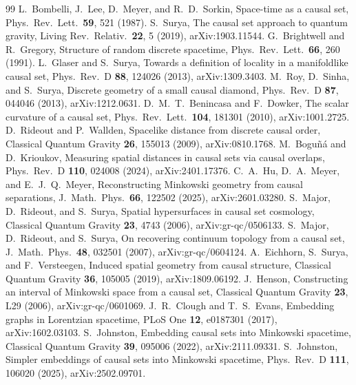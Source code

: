 \documentclass[prd,twocolumn,superscriptaddress,nofootinbib,amsmath,amssymb,floatfix]{revtex4-2}
\begin{document}
\begin{thebibliography}{99}
 L.~Bombelli, J.~Lee, D.~Meyer, and R.~D.~Sorkin, Space-time as a causal set, Phys.\ Rev.\ Lett.\ \textbf{59}, 521 (1987).
 S.~Surya, The causal set approach to quantum gravity, Living Rev.\ Relativ.\ \textbf{22}, 5 (2019), arXiv:1903.11544.
 G.~Brightwell and R.~Gregory, Structure of random discrete spacetime, Phys.\ Rev.\ Lett.\ \textbf{66}, 260 (1991).
 L.~Glaser and S.~Surya, Towards a definition of locality in a manifoldlike causal set, Phys.\ Rev.\ D \textbf{88}, 124026 (2013), arXiv:1309.3403.
 M.~Roy, D.~Sinha, and S.~Surya, Discrete geometry of a small causal diamond, Phys.\ Rev.\ D \textbf{87}, 044046 (2013), arXiv:1212.0631.
 D.~M.~T.~Benincasa and F.~Dowker, The scalar curvature of a causal set, Phys.\ Rev.\ Lett.\ \textbf{104}, 181301 (2010), arXiv:1001.2725.
 D.~Rideout and P.~Wallden, Spacelike distance from discrete causal order, Classical Quantum Gravity \textbf{26}, 155013 (2009), arXiv:0810.1768.
 M.~Bogu\~n\'a and D.~Krioukov, Measuring spatial distances in causal sets via causal overlaps, Phys.\ Rev.\ D \textbf{110}, 024008 (2024), arXiv:2401.17376.
 C.~A.~Hu, D.~A.~Meyer, and E.~J.~Q.~Meyer, Reconstructing Minkowski geometry from causal separations, J.\ Math.\ Phys.\ \textbf{66}, 122502 (2025), arXiv:2601.03280.
 S.~Major, D.~Rideout, and S.~Surya, Spatial hypersurfaces in causal set cosmology, Classical Quantum Gravity \textbf{23}, 4743 (2006), arXiv:gr-qc/0506133.
 S.~Major, D.~Rideout, and S.~Surya, On recovering continuum topology from a causal set, J.\ Math.\ Phys.\ \textbf{48}, 032501 (2007), arXiv:gr-qc/0604124.
 A.~Eichhorn, S.~Surya, and F.~Versteegen, Induced spatial geometry from causal structure, Classical Quantum Gravity \textbf{36}, 105005 (2019), arXiv:1809.06192.
 J.~Henson, Constructing an interval of Minkowski space from a causal set, Classical Quantum Gravity \textbf{23}, L29 (2006), arXiv:gr-qc/0601069.
 J.~R.~Clough and T.~S.~Evans, Embedding graphs in Lorentzian spacetime, PLoS One \textbf{12}, e0187301 (2017), arXiv:1602.03103.
 S.~Johnston, Embedding causal sets into Minkowski spacetime, Classical Quantum Gravity \textbf{39}, 095006 (2022), arXiv:2111.09331.
 S.~Johnston, Simpler embeddings of causal sets into Minkowski spacetime, Phys.\ Rev.\ D \textbf{111}, 106020 (2025), arXiv:2502.09701.

\end{thebibliography}
\end{document}

